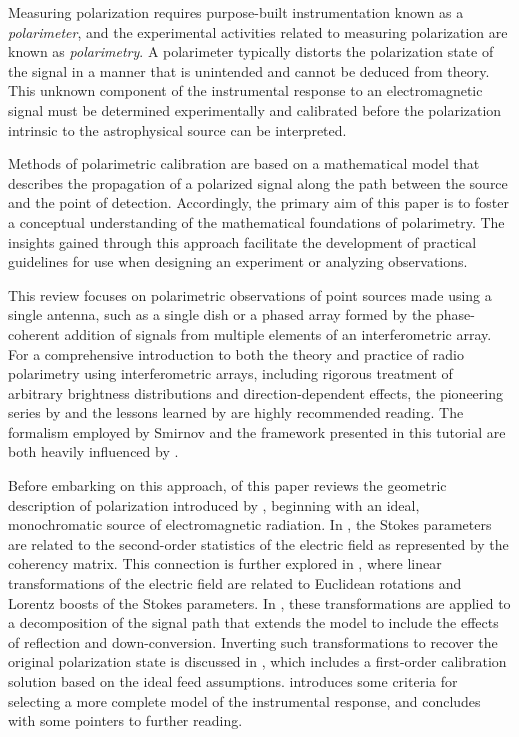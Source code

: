 Measuring polarization requires purpose-built instrumentation known as a \emph{polarimeter}, and the experimental activities related to measuring polarization are known as \emph{polarimetry}.
%
A polarimeter typically distorts the polarization state of the signal in a manner that is unintended and cannot be deduced from theory. This unknown component of the instrumental response to an electromagnetic signal must be 
determined experimentally and
calibrated before the polarization intrinsic to the astrophysical source can be interpreted. 

Methods of polarimetric calibration are based on a mathematical model that describes the propagation of a polarized signal along the path between the source and the point of detection.
%
Accordingly, the primary aim of this paper is to foster a conceptual understanding of the mathematical foundations of polarimetry.
%
The insights gained through this approach facilitate the development of practical guidelines for use when designing an experiment or analyzing observations.

This review focuses on polarimetric observations of point sources made using a single antenna, such as a single dish or a phased array formed by the phase-coherent addition of signals from multiple elements of an interferometric array.
%
For a comprehensive introduction to both the theory and practice 
of radio polarimetry using interferometric arrays, including rigorous treatment of arbitrary brightness distributions and direction-dependent effects, the pioneering series by \citet{smi11a,smi11b,smi11c,smi11d}
and the lessons learned by \citet{lab+17} are highly recommended reading.
%
The formalism employed by Smirnov and the framework presented in this tutorial are both heavily influenced by \cite{ham00}.

Before embarking on this approach,
 of this paper reviews the geometric description of polarization introduced 
by \cite{sto52}, beginning with an ideal, monochromatic source of electromagnetic radiation.
%
In , the Stokes parameters are related to the second-order statistics of 
the electric field as represented by the coherency matrix.
%
This connection is further explored in , where linear transformations of the electric field are related to Euclidean rotations and Lorentz
boosts of the Stokes parameters.
%
In , these transformations are applied to a decomposition of the signal path that extends the \cite{hbs96} model to include the effects of reflection and down-conversion.
%
Inverting such transformations to recover the original polarization state is discussed in , 
which includes a first-order calibration solution based on the ideal feed assumptions.
%
 introduces some criteria for selecting a more complete model of the instrumental response, and  concludes with some pointers to further reading.

